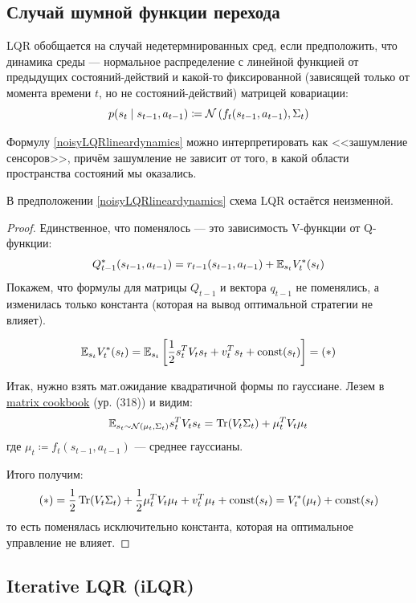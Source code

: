 \subsection{Случай шумной функции перехода}

LQR обобщается на случай недетермнированных сред, если предположить, что динамика среды --- нормальное распределение с линейной функцией от предыдущих состояний-действий и какой-то фиксированной (зависящей только от момента времени $t$, но не состояний-действий) матрицей ковариации:
\begin{equation}\label{noisyLQRlineardynamics}
p(s_{t} \mid s_{t-1}, a_{t-1}) \coloneqq \mathcal{N} \left( f_t(s_{t-1}, a_{t-1}), \Sigma_t \right) 
\end{equation}

Формулу \eqref{noisyLQRlineardynamics} можно интерпретировать как <<зашумление сенсоров>>, причём зашумление не зависит от того, в какой области пространства состояний мы оказались.

\begin{theorem}
В предположении \eqref{noisyLQRlineardynamics} схема LQR остаётся неизменной.
\begin{proof}
Единственное, что поменялось --- это зависимость V-функции от Q-функции:
$$Q^*_{t-1}(s_{t-1}, a_{t-1}) = r_{t-1}(s_{t-1}, a_{t-1}) + \mathbb{E}_{s_t} V_t^*(s_t)$$
Покажем, что формулы для матрицы $Q_{t-1}$ и вектора $q_{t-1}$ не поменялись, а изменилась только константа (которая на вывод оптимальной стратегии не влияет).

$$\mathbb{E}_{s_t} V^*_t(s_t) = \mathbb{E}_{s_t} \left[ \frac{1}{2} s_t^TV_ts_t + v_t^T s_t + \operatorname{const}(s_t) \right] = (*)$$

Итак, нужно взять мат.ожидание квадратичной формы по гауссиане. Лезем в \href{https://www.math.uwaterloo.ca/~hwolkowi/matrixcookbook.pdf}{matrix cookbook} (ур. (318)) и видим:
$$\mathbb{E}_{s_t \sim \mathcal{N}(\mu_t, \Sigma_t)} s_t^TV_ts_t = \operatorname{Tr}(V_t \Sigma_t) + \mu_t^TV_t\mu_t$$
где $\mu_t \coloneqq f_t(s_{t-1}, a_{t-1})$ --- среднее гауссианы.

Итого получим:
$$(*) = \frac{1}{2} \operatorname{Tr}(V_t \Sigma_t) + \frac{1}{2} \mu_t^TV_t\mu_t + v_t^T \mu_t + \operatorname{const}(s_t) = V^*_t(\mu_t) + \operatorname{const}(s_t)$$
то есть поменялась исключительно константа, которая на оптимальное управление не влияет.
\end{proof}
\end{theorem}

\subsection{Iterative LQR (iLQR)}

